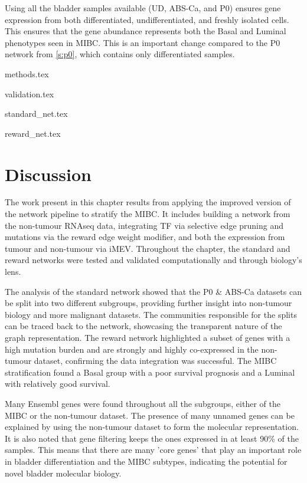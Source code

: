 Using all the bladder samples available (UD, ABS-Ca, and P0) ensures gene expression from both differentiated, undifferentiated, and freshly isolated cells. This ensures that the gene abundance represents both the Basal and Luminal phenotypes seen in MIBC. This is an important change compared to the P0 network from \cref{s:p0}, which contains only differentiated samples.


{methods.tex}

{validation.tex}

{standard_net.tex}

{reward_net.tex}

\section{Discussion}

The work present in this chapter results from applying the improved version of the network pipeline to stratify the MIBC. It includes building a network from the non-tumour RNAseq data, integrating TF via selective edge pruning and mutations via the reward edge weight modifier, and both the expression from tumour and non-tumour via iMEV. Throughout the chapter, the standard and reward networks were tested and validated computationally and through biology's lens. 

The analysis of the standard network showed that the P0 \& ABS-Ca datasets can be split into two different subgroups, providing further insight into non-tumour biology and more malignant datasets. The communities responsible for the splits can be traced back to the network, showcasing the transparent nature of the graph representation. The reward network highlighted a subset of genes with a high mutation burden and are strongly and highly co-expressed in the non-tumour dataset, confirming the data integration was successful. The MIBC stratification found a Basal group with a poor survival prognosis and a Luminal with relatively good survival.

Many Ensembl genes were found throughout all the subgroups, either of the MIBC or the non-tumour dataset. The presence of many unnamed genes can be explained by using the non-tumour dataset to form the molecular representation. It is also noted that gene filtering keeps the ones expressed in at least 90\% of the samples. This means that there are many 'core genes' that play an important role in bladder differentiation and the MIBC subtypes, indicating the potential for novel bladder molecular biology. 

